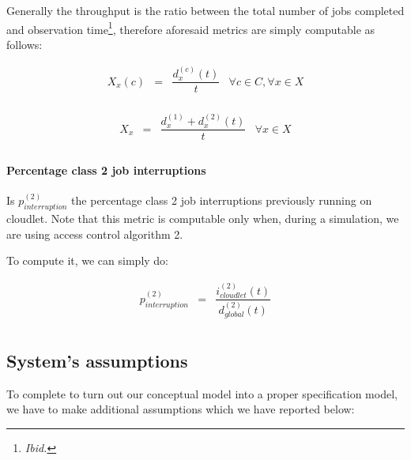 \documentclass[10pt,a4paper]{article}
\begin{document}
Generally the throughput is the ratio between the total number of jobs completed and observation time\footnote{\textit{Ibid.}}, therefore aforesaid metrics are simply computable as follows:

\begin{equation}
\begin{array} {rccr} 
X_x(c) & = & \displaystyle \dfrac{d_x^{(c)}(t)}{t} & \forall c \in C, \forall x \in X \\
\end{array}
\end{equation}

\begin{equation}
\begin{array} {rccr} 
X_x & = & \displaystyle \dfrac{d_x^{(1)} + d_x^{(2)}(t)}{t} & \forall x \in X \\
\end{array}
\end{equation}

\paragraph{Percentage class 2 job interruptions}

Is $p^{(2)}_{interruption}$ the percentage class 2 job interruptions previously running on cloudlet. Note that this metric is computable only when, during a simulation, we are using access control algorithm 2.

To compute it, we can simply do:

\begin{equation}
\begin{array} {rccr} 
p^{(2)}_{interruption} & = & \displaystyle \dfrac{i_{cloudlet}^{(2)}(t)}{d_{global}^{(2)}(t)} \\ 
\end{array}
\end{equation}

\subsection{System's assumptions}

To complete to turn out our conceptual model into a proper specification model, we have to make additional assumptions which we have reported below:
\end{document}
